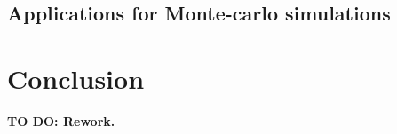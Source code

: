 \documentclass{bioinfo}
\begin{document}
		

		\subsection{Applications for Monte-carlo simulations}
		
		

		\section{Conclusion}
		
		\textbf{TO DO: Rework.}

		
		
	
\end{document}
